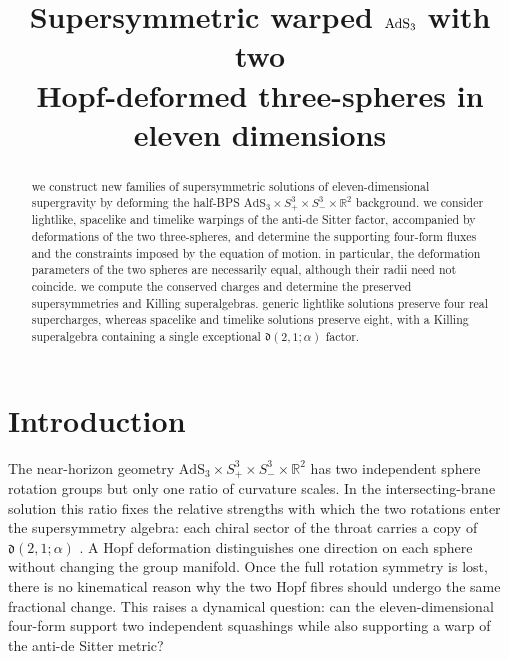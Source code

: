 \documentclass[11pt,a4paper]{article}
\title{Supersymmetric warped $\AdS_3$ with two\protect\\ Hopf-deformed three-spheres in eleven dimensions}
\author{}\date{}
\numberwithin{equation}{section}
\newcommand{\AdS}{\mathrm{AdS}}
\begin{document}
\maketitle
\begin{abstract}
we construct new families of supersymmetric solutions of eleven-dimensional supergravity by deforming the half-BPS $\displaystyle{\mathrm{AdS}_{3}\times S^{3}_{+}\times S^{3}_{-}\times \mathbb{R}^{2}}$ background. we consider lightlike, spacelike and timelike warpings of the anti-de Sitter factor, accompanied by deformations of the two three-spheres, and determine the supporting four-form fluxes and the constraints imposed by the equation of motion. in particular, the deformation parameters of the two spheres are necessarily equal, although their radii need not coincide. we compute the conserved charges and determine the preserved supersymmetries and Killing superalgebras. generic lightlike solutions preserve four real supercharges, whereas spacelike and timelike solutions preserve eight, with a Killing superalgebra containing a single exceptional $\displaystyle{\mathfrak{d}(2,1;\alpha)}$ factor.
\end{abstract}

\section{Introduction}

The near-horizon geometry $\AdS_3\times S^3_+\times S^3_-\times\mathbb R^2$ has two independent sphere rotation groups but only one ratio of curvature scales. In the intersecting-brane solution this ratio fixes the relative strengths with which the two rotations enter the supersymmetry algebra: each chiral sector of the throat carries a copy of $\mathfrak d(2,1;\alpha)$ \cite{BPS,GGP}. A Hopf deformation distinguishes one direction on each sphere without changing the group manifold. Once the full rotation symmetry is lost, there is no kinematical reason why the two Hopf fibres should undergo the same fractional change. This raises a dynamical question: can the eleven-dimensional four-form support two independent squashings while also supporting a warp of the anti-de Sitter metric?
\end{document}
